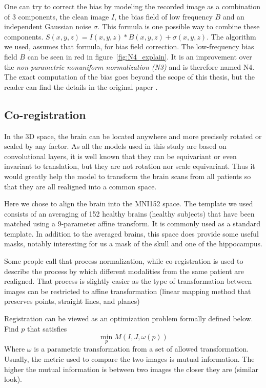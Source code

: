 One can try to correct the bias by modeling the recorded image as a combination of 3 components, the clean image $I$, the bias field of low frequency $B$ and an independent Gaussian noise $\sigma$. This formula is one possible way to combine these components. $S(x,y,z)= I(x,y,z)*B(x,y,z) +\sigma(x,y,z)$. The algorithm we used, assumes that formula, for bias field correction. The low-frequency bias field $B$ can be seen in red in figure~\ref{fig:N4_explain}. It is an improvement over the \textit{non-parametric nonuniform normalization (N3)} and is therefore named N4. 
The exact computation of the bias goes beyond the scope of this thesis, but the reader can find the details in the original paper \cite{N4_paper}.


\subsection{Co-registration}
\label{sec:coregistration}

In the 3D space, the brain can be located anywhere and more precisely rotated or scaled by any factor. As all the models used in this study are based on convolutional layers, it is well known that they can be equivariant or even invariant to translation, but they are not rotation nor scale equivariant. Thus it would greatly help the model to transform the brain scans from all patients so that they are all realigned into a common space. 

Here we chose to align the brain into the MNI152 space\footnotemark{}. The template we used consists of an averaging of 152 healthy brains (healthy subjects) that have been matched using a 9-parameter affine transform. It is commonly used as a standard template. In addition to the averaged brains, this space does provide some useful masks, notably interesting for us a mask of the skull and one of the hippocampus.

Some people call that process normalization, while co-registration is used to describe the process by which different modalities from the same patient are realigned. That process is slightly easier as the type of transformation between images can be restricted to affine transformation (linear mapping method that preserves points, straight lines, and planes)

Registration can be viewed as an optimization problem formally defined below.
Find $p$ that satisfies
$$\displaystyle  \min_{p} M(I,J, \omega(p))$$
Where $\omega$ is a parametric transformation from a set of allowed transformation. Usually, the metric used to compare the two images is mutual information. The higher the mutual information is between two images the closer they are (similar look).


